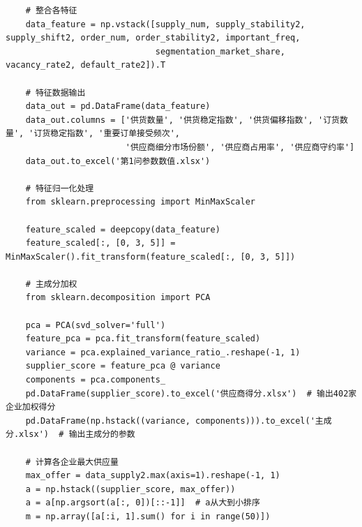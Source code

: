 \documentclass[UTF8]{ctexart}
\begin{document}
\begin{lstlisting}
	# 整合各特征
	data_feature = np.vstack([supply_num, supply_stability2, supply_shift2, order_num, order_stability2, important_freq,
							  segmentation_market_share, vacancy_rate2, default_rate2]).T
	
	# 特征数据输出
	data_out = pd.DataFrame(data_feature)
	data_out.columns = ['供货数量', '供货稳定指数', '供货偏移指数', '订货数量', '订货稳定指数', '重要订单接受频次',
						'供应商细分市场份额', '供应商占用率', '供应商守约率']
	data_out.to_excel('第1问参数数值.xlsx')
	
	# 特征归一化处理
	from sklearn.preprocessing import MinMaxScaler
	
	feature_scaled = deepcopy(data_feature)
	feature_scaled[:, [0, 3, 5]] = MinMaxScaler().fit_transform(feature_scaled[:, [0, 3, 5]])
	
	# 主成分加权
	from sklearn.decomposition import PCA
	
	pca = PCA(svd_solver='full')
	feature_pca = pca.fit_transform(feature_scaled)
	variance = pca.explained_variance_ratio_.reshape(-1, 1)
	supplier_score = feature_pca @ variance
	components = pca.components_
	pd.DataFrame(supplier_score).to_excel('供应商得分.xlsx')  # 输出402家企业加权得分
	pd.DataFrame(np.hstack((variance, components))).to_excel('主成分.xlsx')  # 输出主成分的参数
	
	# 计算各企业最大供应量
	max_offer = data_supply2.max(axis=1).reshape(-1, 1)
	a = np.hstack((supplier_score, max_offer))
	a = a[np.argsort(a[:, 0])[::-1]]  # a从大到小排序
	m = np.array([a[:i, 1].sum() for i in range(50)])


		
\end{lstlisting}
\end{document}
